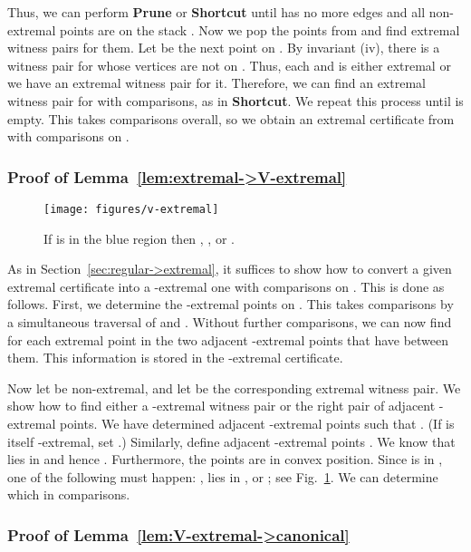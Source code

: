 \documentclass[letterpaper,11pt]{article}
\begin{document}
Thus, we can perform \textbf{Prune} or 
\textbf{Shortcut} until  has no more 
edges and all non-extremal points are on 
the stack .  Now we pop the points from 
 and find extremal witness pairs for them.
Let  be the next point on .  By invariant 
(iv), there is a witness pair 
for  whose vertices are not on . Thus, 
each  and  is either extremal or we 
have an extremal witness pair for it.
Therefore, we can find an extremal witness 
pair for  with  comparisons, as 
in \textbf{Shortcut}. We repeat this process 
until  is empty. This takes  comparisons
overall, so we obtain an extremal 
certificate  from  with  
comparisons on . 

\subsubsection{Proof of Lemma~\ref{lem:extremal->V-extremal}}
\label{sec:extremal->V-extremal}

\begin{figure}
  \centering
  \texttt{[image: figures/v-extremal]}
  \caption{If  is in the blue region then 
    , , 
    or .}
  \label{fig:v-extremal}
\end{figure}

As in Section~\ref{sec:regular->extremal}, it 
suffices to show how to convert a given 
extremal certificate into a 
-extremal one
with  comparisons on . This 
is done as follows.  First, we determine 
the -extremal points on 
. This takes 
comparisons by a simultaneous traversal 
of  and .
Without further comparisons, we can 
now find for each extremal
point  in  the two adjacent 
-extremal points that
have  between them. This information 
is stored in the -extremal
certificate.

Now let  be non-extremal, and 
let  be the corresponding
extremal witness pair. We show how 
to find either a -extremal 
witness pair or the right pair of 
adjacent -extremal points.
We have determined adjacent 
-extremal points  
such that . 
(If  is itself -extremal, 
set .) Similarly, define 
adjacent -extremal points 
. We know that  lies in
 and hence 
.  Furthermore, 
the points  are 
in convex position.  Since  is in 
, one of the following 
must happen: , 
 lies in , or 
; see 
Fig.~\ref{fig:v-extremal}.  
We can determine which in 
 comparisons.

\subsubsection{Proof of Lemma~\ref{lem:V-extremal->canonical}}
\label{sec:V-extremal->canonical}
\end{document}
